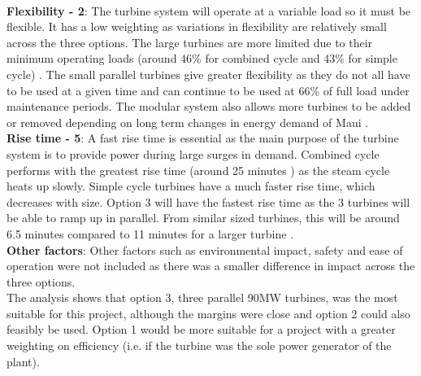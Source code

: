 \\\textbf{Flexibility - 2}: The turbine system will operate at a variable load so it must be flexible. It has a low weighting as variations in flexibility are relatively small across the three options. The large turbines are more limited due to their minimum operating loads (around 46\% for combined cycle and 43\% for simple cycle) \cite{PDF:GElarge}. The small parallel turbines give greater flexibility as they do not all have to be used at a given time and can continue to be used at 66\% of full load under maintenance periods. The modular system also allows more turbines to be added or removed depending on long term changes in energy demand of Maui \cite{website:multipleunits}.
\\\textbf{Rise time - 5}: A fast rise time is essential as the main purpose of the turbine system is to provide power during large surges in demand. Combined cycle performs with the greatest rise time (around 25 minutes \cite{PDF:GElarge}) as the steam cycle heats up slowly. Simple cycle turbines have a much faster rise time, which decreases with size. Option 3 will have the fastest rise time as the 3 turbines will be able to ramp up in parallel. From similar sized turbines, this will be around 6.5 minutes \cite{PDF:GE} compared to 11 minutes for a larger turbine \cite{PDF:GElarge}. \cite{website:multipleunits}
\\\textbf{Other factors}: Other factors such as environmental impact, safety and ease of operation were not included as there was a smaller difference in impact across the three options.\\
The analysis shows that option 3, three parallel 90MW turbines, was the most suitable for this project, although the margins were close and option 2 could also feasibly be used. Option 1 would be more suitable for a project with a greater weighting on efficiency (i.e. if the turbine was the sole power generator of the plant).

